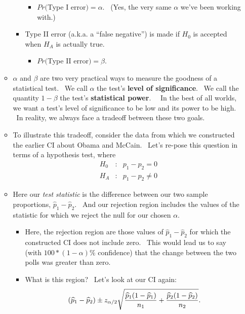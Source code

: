 \documentclass[11pt]{article}
\begin{document}
\begin{itemize}
\begin{itemize}
\begin{itemize}
\begin{itemize}
\item $Pr($Type I error$)=\alpha .$ \ (Yes, the very same $\alpha $ we've
been working with.)
\end{itemize}

\item Type II error (a.k.a. a \textquotedblleft false
negative\textquotedblright ) is made if $H_{0}$ is accepted when $H_{A}$ is
actually true.

\begin{itemize}
\item $Pr($Type II error$)=\beta .$ \ 
\end{itemize}
\end{itemize}

\item $\alpha $ and $\beta $ are two very practical ways to measure the
goodness of a statistical test. \ We call $\alpha $ the test's \textbf{level
of significance}. \ We call the quantity $1-\beta $ the test's \textbf{%
statistical power}. \ \ In the best of all worlds, we want a test's level of
significance to be low and its power to be high. \ In reality, we always
face a tradeoff between these two goals.

\item To illustrate this tradeoff, consider the data from which we
constructed the earlier CI about Obama and McCain. \ Let's re-pose this
question in terms of a hypothesis test, where%
\begin{eqnarray*}
H_{0} &:&p_{1}-p_{2}=0 \\
H_{A} &:&p_{1}-p_{2}\neq 0
\end{eqnarray*}

\item Here our \textit{test statistic }is the difference between our two
sample proportions, $\widehat{p}_{1}-\widehat{p}_{2}.$ \ And our rejection
region includes the values of the statistic for which we reject the null for
our chosen $\alpha .$

\begin{itemize}
\item Here, the rejection region are those values of $\widehat{p}_{1}-%
\widehat{p}_{2}$ for which the constructed CI does not include zero. \ This
would lead us to say (with $100\ast (1-\alpha )\%$ confidence) that the
change between the two polls was greater than zero. \ 

\item What is this region? \ Let's look at our CI again:%
\begin{equation*}
\left( \widehat{p}_{1}-\widehat{p}_{2}\right) \pm z_{\alpha /2}\sqrt{\frac{%
\widehat{p}_{1}(1-\widehat{p}_{1})}{n_{1}}+\frac{\widehat{p}_{2}(1-\widehat{p%
}_{2})}{n_{2}}}.
\end{equation*}


\end{itemize}
\end{itemize}
\end{itemize}
\end{document}
